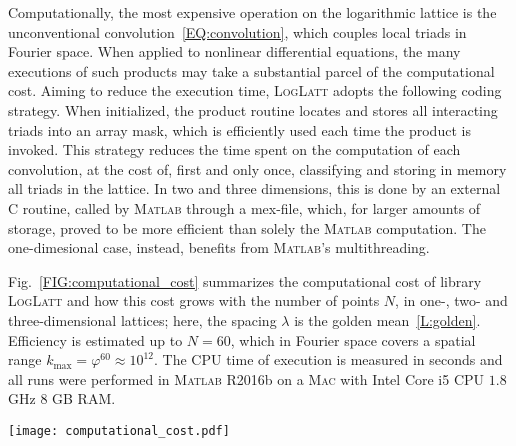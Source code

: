 \documentclass[12pt]{article}
\theoremstyle{definition}
\begin{document}
	Computationally, the most expensive operation on the logarithmic lattice is the unconventional convolution~\eqref{EQ:convolution}, which couples local triads in Fourier space.
	When applied to nonlinear differential equations, the many executions of such products may take a substantial parcel of the computational cost.
	Aiming to reduce the execution time, \textsc{LogLatt} adopts the following coding strategy.
	When initialized, the product routine locates and stores all interacting triads into an array mask, which is efficiently used each time the product is invoked.
	This strategy reduces the time spent on the computation of each convolution, at the cost of, first and only once, classifying and storing in memory all triads in the lattice.
	In two and three dimensions, this is done by an external C routine, called by \textsc{Matlab} through a mex-file, which, for larger amounts of storage, proved to be more efficient than solely the \textsc{Matlab} computation.
	The one-dimesional case, instead, benefits from \textsc{Matlab}'s multithreading.
	
	Fig.~\ref{FIG:computational_cost} summarizes the computational cost of library \textsc{LogLatt} and how this cost grows with the number of points $N$, in one-, two- and three-dimensional lattices; here, the spacing $\lambda$ is the golden mean~\ref{L:golden}.
	Efficiency is estimated up to $N = 60$, which in Fourier space covers a spatial range $k_{\max} = \varphi^{60} \approx 10^{12}$.
	The CPU time of execution is measured in seconds and all runs were performed in \textsc{Matlab} R2016b on a \textsc{Mac}\textsuperscript{\circledR} with Intel\textsuperscript{\circledR} Core i5 CPU $1.8$ GHz $8$ GB RAM.
	
	\begin{figure*}[t]
		\centering
		\texttt{[image: computational\_cost.pdf]}
		\caption{Computational cost of CPU time, in seconds, and memory usage, in MegaBytes, of the product routines with respect to the number of node points $N$, for one-, two- and three-dimensional lattices with golden mean spacing~\ref{L:golden}: (a)~time for initialization of product routines; (b)~memory occupied by the product function handle; (c)~time of computation for one product~\eqref{EQ:convolution}. Dashed lines indicating growths $\propto N^d$ for $d=2,3$ are plotted for comparison. All figures are in log-scale.}
		\label{FIG:computational_cost}
	\end{figure*}
	
\end{document}
